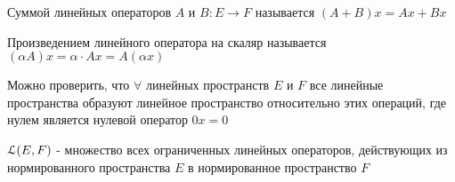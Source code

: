 \documentclass[a4paper,12pt]{report}
\begin{document}
\begin{df} Суммой линейных операторов $A$ и $B\colon E\to F$ называется $(A+B)x=Ax+Bx$

Произведением линейного оператора на скаляр называется $(\alpha A)x=\alpha\cdot Ax=A(\alpha x)$
\end{df}

Можно проверить, что $\forall$ линейных пространств $E$ и $F$ все линейные пространства образуют линейное пространство относительно этих операций, где нулем является нулевой оператор $0x=0$


\begin{df} $\EuScript L(E,F)$ - множество всех ограниченных линейных операторов, действующих из нормированного пространства $E$ в нормированное пространство $F$
\end{df}
\end{document}
